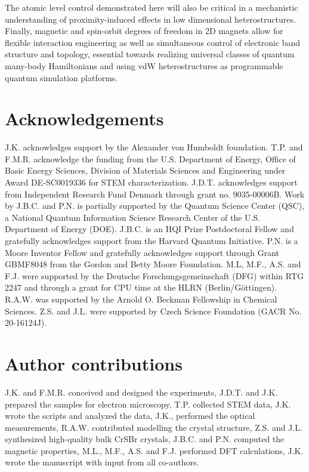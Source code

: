 \documentclass[aps,prl,showpacs,twocolumn,superscriptaddress,floatfix]{revtex4-2}
\begin{document}
The atomic level control demonstrated here will also be critical in a mechanistic understanding of proximity-induced effects in low dimensional heterostructures. Finally, magnetic and spin-orbit degrees of freedom in 2D magnets allow for flexible interaction engineering as well as simultaneous control of electronic band structure and topology, essential towards realizing universal classes of quantum many-body Hamiltonians and using vdW heterostructures as programmable quantum simulation platforms.

%
%
\section{Acknowledgements}
J.K. acknowledges support by the Alexander von Humboldt foundation. T.P. and F.M.R. acknowledge the funding from the U.S. Department of Energy, Office of Basic Energy Sciences, Division of Materials Sciences and Engineering under Award DE‐SC0019336 for STEM characterization. J.D.T. acknowledges support from Independent Research Fund Denmark through grant no. 9035-00006B. Work by J.B.C. and P.N. is partially supported by the Quantum Science Center (QSC), a National Quantum Information Science Research Center of the U.S. Department of Energy (DOE). J.B.C. is an HQI Prize Postdoctoral Fellow and gratefully acknowledges support from the Harvard Quantum Initiative. P.N. is a Moore Inventor Fellow and gratefully acknowledges support through Grant GBMF8048 from the Gordon and Betty Moore Foundation. M.L, M.F., A.S. and F.J. were supported by the Deutsche Forschungsgemeinschaft (DFG) within RTG 2247 and through a grant for CPU time at the HLRN (Berlin/G\"ottingen). R.A.W. was supported by the Arnold O. Beckman Fellowship in Chemical Sciences. Z.S. and J.L. were supported by Czech Science Foundation (GACR No. 20-16124J).

\section{Author contributions}
J.K. and F.M.R. conceived and designed the experiments, J.D.T. and J.K. prepared the samples for electron microscopy, T.P. collected STEM data, J.K. wrote the scripts and analyzed the data, J.K., performed the optical measurements, R.A.W. contributed modelling the crystal structure, Z.S. and J.L. synthesized high-quality bulk CrSBr crystals, J.B.C. and P.N. computed the magnetic properties, M.L., M.F., A.S. and F.J. performed DFT calculations, J.K. wrote the manuscript with input from all co-authors. \\
\end{document}
